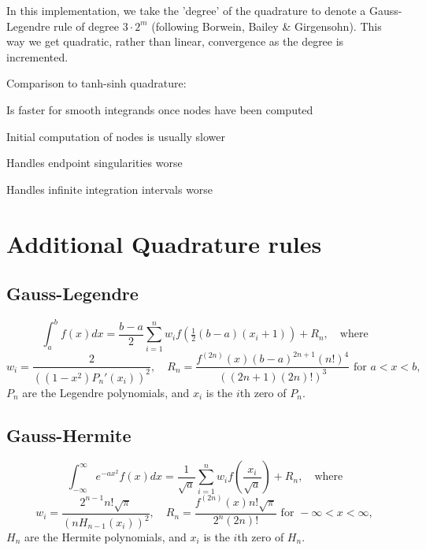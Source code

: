 In this implementation, we take the 'degree' of the quadrature to denote a Gauss-Legendre rule of degree $3 \cdot 2^m$ (following Borwein, Bailey \& Girgensohn). This way we get quadratic, rather than linear, convergence as the degree is incremented.

Comparison to tanh-sinh quadrature:

Is faster for smooth integrands once nodes have been computed

Initial computation of nodes is usually slower

Handles endpoint singularities worse

Handles infinite integration intervals worse

%
%
%

\newpage
\section{Additional Quadrature rules}


\subsection{Gauss-Legendre}
\begin{equation}
\int_a^b f(x) dx = \frac{b-a}{2} \sum_{i=1}^n w_i f\left(\tfrac{1}{2}(b-a)(x_i +1)\right) + R_n, \quad \text{where}
\end{equation}
\begin{equation}
w_i = \frac{2}{((1-x^2)P_n' (x_i))^2}, \quad R_n=\frac{f^{(2n)}(x)(b-a)^{2n+1}(n!)^4}{((2n+1)(2n)!)^3} \text{ for } a<x<b,
\end{equation}
$P_n$ are the Legendre polynomials, and $x_i$ is the $i$th zero of $P_n$.




\subsection{Gauss-Hermite}
\begin{equation}
\int_{-\infty}^\infty e^{-ax^2} f(x) dx = \frac{1}{\sqrt{a}} \sum_{i=1}^n w_i f\left(\frac{x_i}{\sqrt{a}}\right) + R_n, \quad \text{where}
\end{equation}
\begin{equation}
w_i = \frac{2^{n-1} n! \sqrt{\pi}}{(nH_{n-1} (x_i))^2}, \quad R_n=\frac{f^{(2n)}(x) n! \sqrt{\pi}}{2^n (2n)!} \text{ for } -\infty<x<\infty,
\end{equation}
$H_n$ are the Hermite polynomials, and $x_i$ is the $i$th zero of $H_n$.





